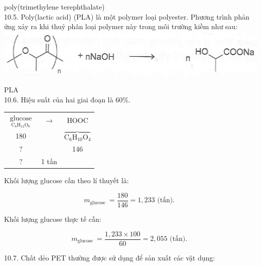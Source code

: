 \documentclass[10pt]{article}
\begin{document}
poly(trimethylene terephthalate)\\
10.5. Poly(lactic acid) (PLA) là một polymer loại polyester. Phương trình phản ứng xảy ra khi thuỷ phân loại polymer này trong môi trường kiềm như sau:\\
\includegraphics[max width=\textwidth, center]{2025_10_23_b4e16b74380d0f7e7700g-064}

PLA\\
10.6. Hiệu suất của hai giai đoạn là $60 \%$.

\begin{center}
\begin{tabular}{ccc}
$\underset{\mathrm{C}_{6} \mathrm{H}_{12} \mathrm{O}_{6}}{\text { glucose }}$ & $\longrightarrow$ & HOOC \\
180 &  & $\overbrace{\mathrm{C}_{6} \mathrm{H}_{10} \mathrm{O}_{4}}$ \\
$?$ &  & 146 \\
$?$ & 1 tấn &  \\
\end{tabular}
\end{center}

Khối lượng glucose cần theo lí thuyết là:

$$
m_{\text {glucose }}=\frac{180}{146}=1,233 \text { (tấn). }
$$

Khối lượng glucose thực tế cần:

$$
m_{\text {glucose }}=\frac{1,233 \times 100}{60}=2,055 \text { (tấn). }
$$

10.7. Chất dẻo PET thường được sử dụng để sản xuất các vật dụng:
\end{document}
